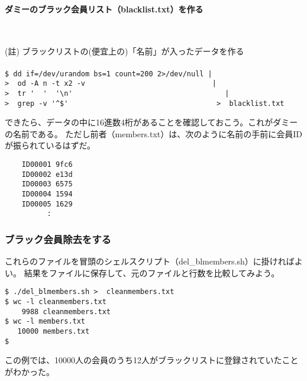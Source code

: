\paragraph{ダミーのブラック会員リスト（blacklist.txt）を作る}　\\
\begin{screen}
	(註) ブラックリストの(便宜上の)「名前」が入ったデータを作る \\
	\\
	\verb!$ dd if=/dev/urandom bs=1 count=200 2>/dev/null |! \return \\
	\verb!>  od -A n -t x2 -v                              |! \return \\
	\verb!>  tr '  '  '\n'                                    |! \return \\
	\verb!>  grep -v '^$'                                   >  blacklist.txt! \\
\end{screen}

できたら、データの中に16進数4桁があることを確認しておこう。これがダミーの名前である。
ただし前者（members.txt）は、次のように名前の手前に会員IDが振られているはずだ。

\begin{verbatim}
	ID00001 9fc6
	ID00002 e13d
	ID00003 6575
	ID00004 1594
	ID00005 1629
	      :
\end{verbatim}

\subsubsection*{ブラック会員除去をする}

これらのファイルを冒頭のシェルスクリプト（del\_{}blmembers.sh）に掛ければよい。
結果をファイルに保存して、元のファイルと行数を比較してみよう。

\begin{screen}
	\verb!$ ./del_blmembers.sh >  cleanmembers.txt! \return \\
	\verb!$ wc -l cleanmembers.txt! \return                \\
	\verb!    9988 cleanmembers.txt!                       \\
	\verb!$ wc -l members.txt! \return                     \\
	\verb!   10000 members.txt!                            \\
	\verb!$ !
\end{screen}

この例では、10000人の会員のうち12人がブラックリストに登録されていたことがわかった。

